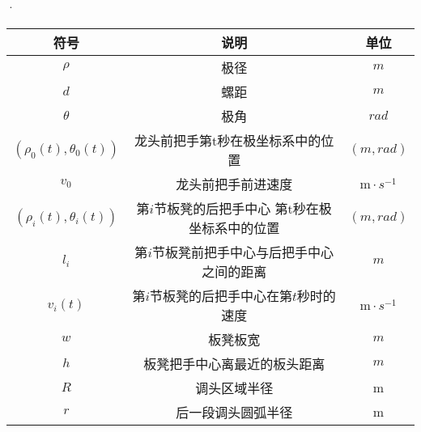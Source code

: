 \documentclass[../main.tex]{subfiles}
\begin{document}



\begin{table}[H]
    \centering·
    \begin{tabular}{ccc}
    \hline
    符号 & 说明 & 单位  \\ 
    \hline
    $\rho$                 & 极径                     & $m$                      \\
    $d$                   & 螺距                      &   $m$                    \\
    $\theta $                    & 极角                     & $rad$                      \\
 \((\rho _0(t),\theta _0(t))\)       & 龙头前把手第t秒在极坐标系中的位置                   & $(m,rad) $                     \\
    \(v_0\)                      & 龙头前把手前进速度                     & $\mathrm{m}\cdot s^{-1} $              \\
\((\rho _{i}(t),\theta _{i}(t))\)                   & 第\(i\)节板凳的后把手中心 第t秒在极坐标系中的位置                     & $(m,rad) $                      \\
$l_i$             &   第$i$节板凳前把手中心与后把手中心之间的距离                   & $m$                      \\
  \(v_i(t)\)                     & 第\(i\)节板凳的后把手中心在第\(t\)秒时的速度                     &  $\mathrm{m}\cdot s^{-1} $                    \\
   $w$                      & 板凳板宽                     & $m$                      \\
    $h$                   & 板凳把手中心离最近的板头距离                     & $m$                       \\
  $R$                     & 调头区域半径                     & m                      \\
    $r$                      & 后一段调头圆弧半径                      & m                       \\
   \hline
    \end{tabular}
    \end{table}
\end{document}
